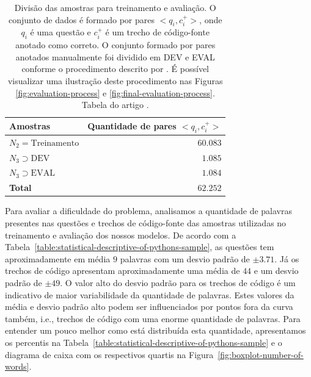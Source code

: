 \begin{table}[h]
\centering
\begin{tabular}{ p{5cm} r  }
 \hline
 \textbf{Amostras} & \textbf{Quantidade de pares $<q_{i}, c_{i}^{+}>$}\\
 \hline
 $N_{2} = \text{Treinamento}$ & $60.083$\\
 
 $N_{3} \supset \text{DEV}$ & $1.085$ \\
 
 $N_{3} \supset \text{EVAL}$ & $1.084$\\
 \hline
 \textbf{Total} & $\bm{62.252}$\\
 \hline
\end{tabular}
\caption[Divisão das amostras para treinamento e avaliação.]{Divisão das amostras para treinamento e avaliação. O conjunto de dados é formado por pares $<q_{i}, c_{i}^{+}>$, onde $q_{i}$ é uma questão e $c_{i}^{+}$ é um trecho de código-fonte anotado como correto. O conjunto formado por pares anotados manualmente foi dividido em DEV e EVAL conforme o procedimento descrito por \cite{iyer-etal-2016-summarizing}. É possível visualizar uma ilustração deste procedimento nas Figuras \ref{fig:evaluation-process} e \ref{fig:final-evaluation-process}. Tabela do artigo \cite{martins2020concra}. }
\label{table:divisao-amostras}
\end{table}


Para avaliar a dificuldade do problema, analisamos a quantidade de palavras presentes nas questões e trechos de código-fonte das amostras utilizadas no treinamento e avaliação dos nossos modelos. De acordo com a Tabela~\ref{table:statistical-descriptive-of-pythons-sample}, as questões tem aproximadamente em média $9$ palavras com um desvio padrão de $\pm 3.71$. Já os trechos de código apresentam aproximadamente uma média de $44$ e um desvio padrão de $\pm 49$. O valor alto do desvio padrão para os trechos de código é um indicativo de maior variabilidade da quantidade de palavras. Estes valores da média e desvio padrão alto podem ser influenciados por pontos fora da curva também, i.e., trechos de código com uma enorme quantidade de palavras. Para entender um pouco melhor como está distribuída esta quantidade, apresentamos os percentis na Tabela~\ref{table:statistical-descriptive-of-pythons-sample} e o diagrama de caixa com os respectivos quartis na Figura~\ref{fig:boxplot-number-of-words}.

